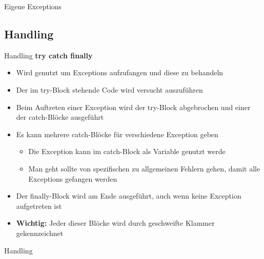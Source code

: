 \begin{frame}{Eigene Exceptions}
	
\end{frame}

\subsection{Handling}
\begin{frame}{Handling}
	\textbf{try catch finally}\\
	\begin{itemize}
		\item Wird genutzt um Exceptions aufzufangen und diese zu behandeln
		\item Der im \alert{try}-Block stehende Code wird versucht auszuführen
		\item Beim Auftreten einer Exception wird der \alert{try}-Block abgebrochen und einer der \alert{catch}-Blöcke ausgeführt
		\item Es kann mehrere \alert{catch}-Blöcke für verschiedene Exception geben
		\begin{itemize}
			\item Die Exception kann im \alert{catch}-Block als Variable genutzt werde
			\item Man geht sollte von spezifischen zu allgemeinen Fehlern gehen, damit alle Exceptions gefangen werden
		\end{itemize}
		\item Der \alert{finally}-Block wird am Ende ausgeführt, auch wenn keine Exception aufgetreten ist
		\item \textbf{Wichtig:} Jeder dieser Blöcke wird durch geschweifte Klammer gekennzeichnet
	\end{itemize}
\end{frame}

\begin{frame}{Handling}
		
\end{frame}


